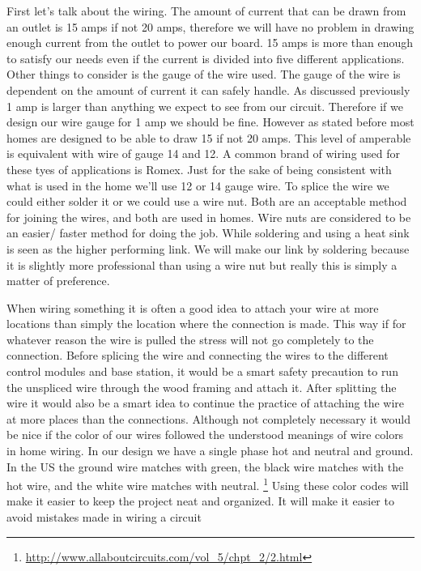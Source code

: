 First let{}'s talk about the wiring. The amount of current that can be drawn
from an outlet is 15 amps if not 20 amps, therefore we will have no problem in
drawing enough current from the outlet to power our board. 15 amps is more than
enough to satisfy our needs even if the current is divided into five different
applications. Other things to consider is the gauge of the wire used. The gauge
of the wire is dependent on the amount of current it can safely handle. As
discussed previously 1 amp is larger than anything we expect to see from our
circuit. Therefore if we design our wire gauge for 1 amp we should be fine.
However as stated before most homes are designed to be able to draw 15 if not
20 amps. This level of amperable is equivalent with wire of gauge 14 and 12. A
common brand of wiring used for these tyes of applications is Romex. Just for
the sake of being consistent with what is used in the home we{}'ll use 12 or 14
gauge wire. To splice the wire we could either solder it or we could use a wire
nut. Both are an acceptable method for joining the wires, and both are used in
homes. Wire nuts are considered to be an easier/ faster method for doing the
job. While soldering and using a heat sink is seen as the higher performing
link. We will make our link by soldering because it is slightly more
professional than using a wire nut but really this is simply a matter of
preference.

When wiring something it is often a good idea to attach your wire at more
locations than simply the location where the connection is made. This way if
for whatever reason the wire is pulled the stress will not go completely to the
connection. Before splicing the wire and connecting the wires to the different
control modules and base station, it would be a smart safety precaution to run
the unspliced wire through the wood framing and attach it. After splitting the
wire it would also be a smart idea to continue the practice of attaching the
wire at more places than the connections. Although not completely necessary it
would be nice if the color of our wires followed the understood meanings of
wire colors in home wiring. In our design we have a single phase hot and
neutral and ground. In the US the ground wire matches with green, the black
wire matches with the hot wire, and the white wire matches with neutral.
\footnote{\url{http://www.allaboutcircuits.com/vol_5/chpt_2/2.html}}
Using these color codes will make it easier to keep the project neat and
organized. It will make it easier to avoid mistakes made in wiring a circuit


